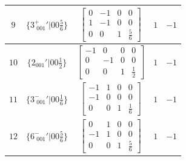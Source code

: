 \documentclass[fleqn,8pt]{jsarticle}
\begin{document}
\begin{longtable}{ccccc}
$ 9 $ & $ \{3^{+}_{\,\,001}{}'|0 0 \frac{5}{6}\} $ & $ \begin{bmatrix} 0 & -1 & 0 & 0 \\ 1 & -1 & 0 & 0 \\ 0 & 0 & 1 & \frac{5}{6} \end{bmatrix} $ & $ 1 $ & $ -1 $ \\ \hline
$ 10 $ & $ \{2{}_{001}{}'|0 0 \frac{1}{2}\} $ & $ \begin{bmatrix} -1 & 0 & 0 & 0 \\ 0 & -1 & 0 & 0 \\ 0 & 0 & 1 & \frac{1}{2} \end{bmatrix} $ & $ 1 $ & $ -1 $ \\ \hline
$ 11 $ & $ \{3^{-}_{\,\,001}{}'|0 0 \frac{1}{6}\} $ & $ \begin{bmatrix} -1 & 1 & 0 & 0 \\ -1 & 0 & 0 & 0 \\ 0 & 0 & 1 & \frac{1}{6} \end{bmatrix} $ & $ 1 $ & $ -1 $ \\ \hline
$ 12 $ & $ \{6^{-}_{\,\,001}{}'|0 0 \frac{5}{6}\} $ & $ \begin{bmatrix} 0 & 1 & 0 & 0 \\ -1 & 1 & 0 & 0 \\ 0 & 0 & 1 & \frac{5}{6} \end{bmatrix} $ & $ 1 $ & $ -1 $ \\
\end{longtable}
\end{document}
